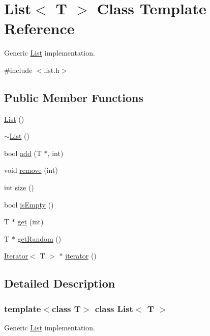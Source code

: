 \hypertarget{classList}{}\section{List$<$ T $>$ Class Template Reference}
\label{classList}


Generic \hyperlink{classList}{List} implementation.  




{\ttfamily \#include $<$list.\+h$>$}

\subsection*{Public Member Functions}
\begin{DoxyCompactItemize}
\item 
\hyperlink{classList_a5c5e27671b21b3815d4e25b953c69454}{List} ()
\item 
\hyperlink{classList_a2b58189090f6e5ce52939c9195e59e85}{$\sim$\+List} ()
\item 
bool \hyperlink{classList_a5800fe042063d0a91f74379809be48ff}{add} (T $\ast$, int)
\item 
void \hyperlink{classList_a55b17d95199c1e323f13d9bd45e2d3cc}{remove} (int)
\item 
int \hyperlink{classList_a2497bdf42246d61237aaf046c116183a}{size} ()
\item 
bool \hyperlink{classList_a73f8b1d313382daffeeeed552f42da2f}{is\+Empty} ()
\item 
T $\ast$ \hyperlink{classList_a29a22f2d421aaec329a0b0f78b82f648}{get} (int)
\item 
T $\ast$ \hyperlink{classList_a8d40594769bf8f9217e24fd1397592a6}{get\+Random} ()
\item 
\hyperlink{classIterator}{Iterator}$<$ T $>$ $\ast$ \hyperlink{classList_aa4bebd7fe394b1738da32e33fd095774}{iterator} ()
\end{DoxyCompactItemize}


\subsection{Detailed Description}
\subsubsection*{template$<$class T$>$\newline
class List$<$ T $>$}

Generic \hyperlink{classList}{List} implementation. 

